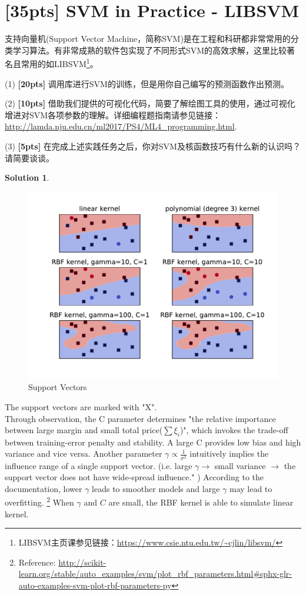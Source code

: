 \documentclass[a4paper,UTF8]{article}
\numberwithin{equation}{section}
\theoremstyle{definition}
\newtheorem*{solution}{Solution}
\begin{document}
\section{[35pts] SVM in Practice - LIBSVM} 
支持向量机(Support Vector Machine，简称SVM)是在工程和科研都非常常用的分类学习算法。有非常成熟的软件包实现了不同形式SVM的高效求解，这里比较著名且常用的如LIBSVM\footnote{LIBSVM主页课参见链接：\url{https://www.csie.ntu.edu.tw/~cjlin/libsvm/}}。

(1) \textbf{[20pts]} 调用库进行SVM的训练，但是用你自己编写的预测函数作出预测。

(2) \textbf{[10pts]} 借助我们提供的可视化代码，简要了解绘图工具的使用，通过可视化增进对SVM各项参数的理解。详细编程题指南请参见链接：\url{http://lamda.nju.edu.cn/ml2017/PS4/ML4_programming.html}. 

(3) \textbf{[5pts]} 在完成上述实践任务之后，你对SVM及核函数技巧有什么新的认识吗？请简要谈谈。
\begin{solution}
\begin{figure}[H]{}
\centering 
\includegraphics[scale=0.7]{figure.pdf}
\caption{Support Vectors}
\end{figure} 
The support vectors are marked with "X". \\
Through observation,  the C parameter determines "the relative importance between large margin and small total price($\sum \xi _i$)", which invokes the trade-off between training-error penalty and stability.  A large C provides low bias and high variance and vice versa.
Another parameter $\gamma \propto \frac{1}{\sigma^2}$ intuitively implies the influence range of a single support vector. (i.e.  large $\gamma \rightarrow$ small variance  $\rightarrow$ the support vector does not have wide-spread influence." ) According to the documentation, lower $\gamma$ leads to smoother models and large $\gamma $ may lead to overfitting.
\footnote{Reference: \url{http://scikit-learn.org/stable/auto_examples/svm/plot_rbf_parameters.html\#sphx-glr-auto-examples-svm-plot-rbf-parameters-py}} 
When $\gamma$ and $C$ are small, the RBF kernel is able to simulate linear kernel.
\end{solution}
\end{document}
